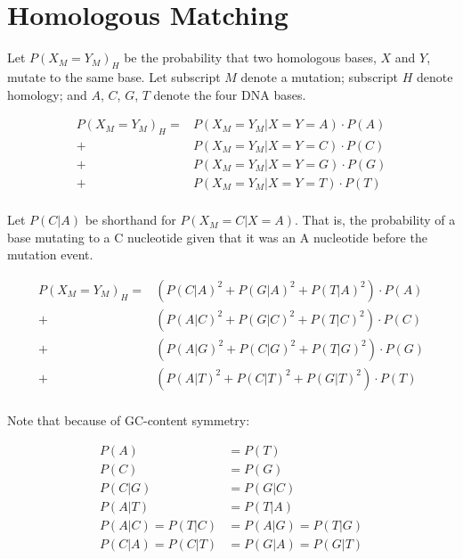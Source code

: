 \documentclass{article}
\begin{document}
\section{Homologous Matching}
  
Let \(P(X_{M} = Y_{M})_{H}\) be the probability that two homologous bases, \(X\) and \(Y\), mutate to the same base. Let subscript \(M\) denote a mutation; subscript \(H\) denote homology; and \(A\), \(C\), \(G\), \(T\) denote the four DNA bases. 
  
\begin{equation}
\begin{split}
  P(X_{M} = Y_{M})_{H} = &P(X_{M} = Y_{M}| X = Y = A) \cdot P(A) \\
    + &P(X_{M} = Y_{M}| X = Y = C) \cdot P(C) \\
    + &P(X_{M} = Y_{M}| X = Y = G) \cdot P(G) \\
    + &P(X_{M} = Y_{M}| X = Y = T) \cdot P(T) \\
\end{split}
\end{equation}
  
Let \(P(C|A)\) be shorthand for \(P(X_{M} = C | X = A)\). That is, the probability of a base mutating to a C nucleotide given that it was an A nucleotide before the mutation event. 

\begin{equation}
\begin{split}
  P(X_{M} = Y_{M})_{H} = &(P(C|A)^2 + P(G|A)^2 + P(T|A)^2) \cdot P(A) \\
    + &(P(A|C)^2 + P(G|C)^2 + P(T|C)^2) \cdot P(C) \\
    + &(P(A|G)^2 + P(C|G)^2 + P(T|G)^2) \cdot P(G) \\
    + &(P(A|T)^2 + P(C|T)^2 + P(G|T)^2) \cdot P(T) \\
\end{split}
\end{equation}
  
Note that because of GC-content symmetry: 
  
\begin{equation}
\begin{split}
  P(A) &= P(T) \\
  P(C) &= P(G) \\
  P(C|G) &= P(G|C)\\
  P(A|T) &= P(T|A)\\
  P(A|C) = P(T|C) &= P(A|G) = P(T|G)\\
  P(C|A) = P(C|T) &= P(G|A) = P(G|T)\\
\end{split}
\end{equation}
  
\end{document}
